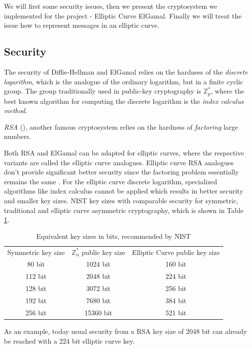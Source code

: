 \documentclass[11pt,english]{article}
\begin{document}
We will first some security issues, then we present the cryptosystem we implemented for the project - Elliptic Curve ElGamal. Finally we will treat the issue how to represent messages in an elliptic curve.

\subsection{Security}
The security of Diffie-Hellman and ElGamal relies on the hardness of the \emph{discrete logarithm}, which is the analogue of the ordinary logarithm, but in a finite cyclic group. The group traditionally used in public-key cryptography is $\mathbb{Z}_p^*$, where the best known algorithm for computing the discrete logarithm is the \emph{index calculus method}.

\emph{RSA} (\cite{Rivest78amethod}), another famous cryptosystem relies on the hardness of \emph{factoring} large numbers.

Both RSA and ElGamal can be adapted for elliptic curves, where the respective variants are called the elliptic curve analogues. Elliptic curve RSA analogues don't provide significant better security since the factoring problem essentially remains the same \cite{343485}. For the elliptic curve discrete logarithm, specialized algorithms like index calculus cannot be applied which results in better security and smaller key sizes. NIST key sizes with comparable security for symmetric, traditional and elliptic curve asymmetric cryptography, which is shown in Table \ref{eqks}.

\begin{table}
\centering
\begin{tabular}{c|c|c}
Symmetric key size & $\mathbb{Z}_{n}^{*}$ public key size & Elliptic Curve public key size \\ \cline{1-3}
80 bit & 1024 bit & 160 bit \\ 
112 bit & 2048 bit & 224 bit \\ 
128 bit & 3072 bit & 256 bit \\ 
192 bit & 7680 bit & 384 bit \\ 
256 bit & 15360 bit & 521 bit
\end{tabular}
\caption{Equivalent key sizes in bits, recommended by NIST}
\label{eqks}
\end{table}

As an example, today usual security from a RSA key size of 2048 bit can already be reached with a 224 bit elliptic curve key.
\end{document}
